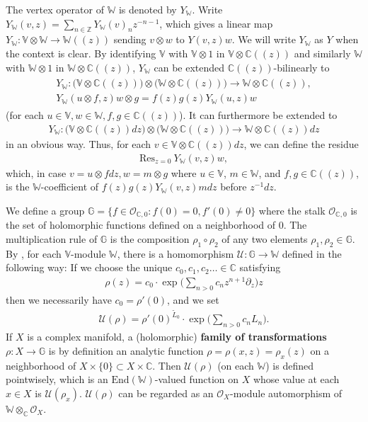 \documentclass[12pt,a4paper,notitlepage]{article}
\theoremstyle{definition}
\theoremstyle{plain}
\newcommand{\mc}{\mathcal}
\newcommand{\wtd}{\widetilde}
\newcommand{\End}{\mathrm{End}} %
\newcommand{\Res}{\mathrm{Res}}
\newcommand{\scr}{\mathscr}
\newcommand{\Vbb}{\mathbb V}
\newcommand{\Wbb}{\mathbb W}
\newcommand{\Gbb}{\mathbb G}
\newcommand{\Cbb}{\mathbb C}
\newcommand{\Zbb}{\mathbb Z}
\numberwithin{equation}{section}
\begin{document}
The vertex operator of $\Wbb$ is denoted by $Y_\Wbb$. Write $Y_\Wbb(v,z)=\sum_{n\in\Zbb}Y_\Wbb(v)_nz^{-n-1}$, which gives a linear map $Y_\Wbb:\Vbb\otimes\Wbb\rightarrow \Wbb((z))$ sending $v\otimes w$ to $Y(v,z)w$. We will write $Y_\Wbb$ as $Y$ when the context is clear. By identifying $\Vbb$ with $\Vbb\otimes 1$ in $\Vbb\otimes\Cbb((z))$ and similarly $\Wbb$ with $\Wbb\otimes 1$ in $\Wbb\otimes\Cbb((z))$, $Y_\Wbb$ can be extended $\Cbb((z))$-bilinearly to \index{YW@$Y_\Wbb$}
\begin{gather}
\begin{array}{c}
Y_\Wbb:\Big(\Vbb\otimes\Cbb((z))\Big)\otimes\Big(\Wbb\otimes \Cbb((z))\Big)\rightarrow \Wbb\otimes\Cbb((z)),\\[1.5ex]
Y_\Wbb(u\otimes f,z)w\otimes g=f(z)g(z)Y_\Wbb(u,z)w
\end{array}\label{eq3}
\end{gather}
(for each $u\in\Vbb,w\in\Wbb,f,g\in\Cbb((z))$). It can furthermore be extended to 
\begin{align}
Y_\Wbb:	\Big(\Vbb\otimes\Cbb((z))dz\Big)\otimes \Big(\Wbb\otimes\Cbb((z))\Big)\rightarrow \Wbb\otimes \Cbb((z))dz \label{eq4}
\end{align}
in an obvious way. Thus, for each $v\in\Vbb\otimes\Cbb((z))dz$, we can define the residue \index{Res@$\Res$}
\begin{align}
\Res_{z=0}~Y_\Wbb(v,z)w,\label{eq5}
\end{align}
which, in case $v=u\otimes fdz,w=m\otimes g$ where $u\in\Vbb$, $m\in\Wbb$,  and $f,g\in\Cbb((z))$, is the $\Wbb$-coefficient of  $f(z)g(z)Y_\Wbb(v,z)mdz$ before $z^{-1}dz$.

We define a group $\Gbb=\{f\in\scr O_{\Cbb,0}:f(0)=0,f'(0)\neq 0\}$ \index{G@$\Gbb$} where the stalk $\scr O_{\Cbb,0}$ is the set of holomorphic functions defined on a neighborhood of $0$. The multiplication  rule of $\Gbb$ is the composition $\rho_1\circ\rho_2$ of any two elements $\rho_1,\rho_2\in\Gbb$. By \cite{Hua97}, for each $\Vbb$-module $\Wbb$, there is a homomorphism $\mc U:\Gbb\rightarrow\Wbb$ defined in the following way: If we choose the unique $c_0,c_1,c_2\dots\in\Cbb$ satisfying
\begin{align*}
\rho(z)=c_0\cdot\exp\Big(\sum_{n>0}c_nz^{n+1}\partial_z\Big)z
\end{align*}
then we necessarily have $c_0=\rho'(0)$, and we set \index{U@$\mc U(\rho)$}
\begin{align*}
\mc U(\rho)=\rho'(0)^{\wtd L_0}\cdot\exp\Big(\sum_{n>0}c_nL_n\Big).
\end{align*}
If $X$ is a complex manifold,  a (holomorphic) \textbf{family of transformations} $\rho:X\rightarrow\Gbb$ is by definition an analytic function $\rho=\rho(x,z)=\rho_x(z)$ on a neighborhood of  $X\times\{0\}\subset X\times\Cbb$. Then $\mc U(\rho)$ (on each $\Wbb$) is defined pointwisely, which is an $\End(\Wbb)$-valued function on $X$ whose value at each $x\in X$ is $\mc U(\rho_x)$. $\mc U(\rho)$ can be regarded as an $\scr O_X$-module automorphism of $\Wbb\otimes_\Cbb\scr O_X$. 
\end{document}
